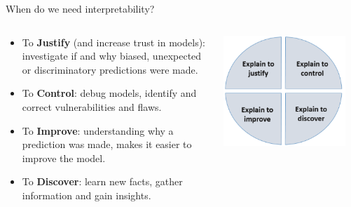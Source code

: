 \documentclass[11pt,compress,t,notes=noshow, aspectratio=169, xcolor=table]{beamer}
\begin{document}
\begin{frame}{When do we need interpretability?}
\begin{columns}[T]
\begin{column}{0.55\textwidth}
\begin{itemize}
  \item To \textbf{Justify} (and increase trust in models): investigate if and why biased, unexpected or discriminatory predictions were made. 	\pause
  \item To \textbf{Control}: debug models, identify and correct vulnerabilities and flaws. 	\pause
  \item To \textbf{Improve}: understanding why a prediction was made, makes it easier to improve the model. 	\pause
  \item To \textbf{Discover}: learn new facts, gather information and gain insights.
\end{itemize}
\end{column}
\begin{column}{0.4\textwidth}  %
  \includegraphics[width=0.9\textwidth]{figure/explain-to}

\end{column}
\end{columns}
\end{frame}
\end{document}
